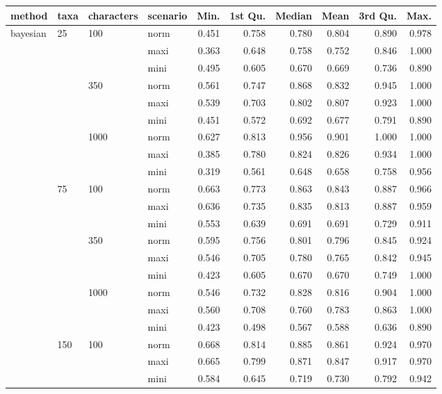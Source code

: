\begin{longtable}{llllrrrrrr}
  \hline
method & taxa & characters & scenario & Min. & 1st Qu. & Median & Mean & 3rd Qu. & Max. \\ 
  \hline
bayesian & 25 & 100 & norm & 0.451 & 0.758 & 0.780 & 0.804 & 0.890 & 0.978 \\ 
   &  &  & maxi & 0.363 & 0.648 & 0.758 & 0.752 & 0.846 & 1.000 \\ 
   &  &  & mini & 0.495 & 0.605 & 0.670 & 0.669 & 0.736 & 0.890 \\ 
   &  & 350 & norm & 0.561 & 0.747 & 0.868 & 0.832 & 0.945 & 1.000 \\ 
   &  &  & maxi & 0.539 & 0.703 & 0.802 & 0.807 & 0.923 & 1.000 \\ 
   &  &  & mini & 0.451 & 0.572 & 0.692 & 0.677 & 0.791 & 0.890 \\ 
   &  & 1000 & norm & 0.627 & 0.813 & 0.956 & 0.901 & 1.000 & 1.000 \\ 
   &  &  & maxi & 0.385 & 0.780 & 0.824 & 0.826 & 0.934 & 1.000 \\ 
   &  &  & mini & 0.319 & 0.561 & 0.648 & 0.658 & 0.758 & 0.956 \\ 
   & 75 & 100 & norm & 0.663 & 0.773 & 0.863 & 0.843 & 0.887 & 0.966 \\ 
   &  &  & maxi & 0.636 & 0.735 & 0.835 & 0.813 & 0.887 & 0.959 \\ 
   &  &  & mini & 0.553 & 0.639 & 0.691 & 0.691 & 0.729 & 0.911 \\ 
   &  & 350 & norm & 0.595 & 0.756 & 0.801 & 0.796 & 0.845 & 0.924 \\ 
   &  &  & maxi & 0.546 & 0.705 & 0.780 & 0.765 & 0.842 & 0.945 \\ 
   &  &  & mini & 0.423 & 0.605 & 0.670 & 0.670 & 0.749 & 1.000 \\ 
   &  & 1000 & norm & 0.546 & 0.732 & 0.828 & 0.816 & 0.904 & 1.000 \\ 
   &  &  & maxi & 0.560 & 0.708 & 0.760 & 0.783 & 0.863 & 1.000 \\ 
   &  &  & mini & 0.423 & 0.498 & 0.567 & 0.588 & 0.636 & 0.890 \\ 
   & 150 & 100 & norm & 0.668 & 0.814 & 0.885 & 0.861 & 0.924 & 0.970 \\ 
   &  &  & maxi & 0.665 & 0.799 & 0.871 & 0.847 & 0.917 & 0.970 \\ 
   &  &  & mini & 0.584 & 0.645 & 0.719 & 0.730 & 0.792 & 0.942 \\ 

\end{longtable}
